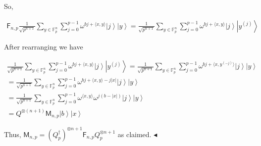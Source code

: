 \documentclass[10pt,a4paper]{article}
\begin{document}
So,\par


\[\begin{gathered}
\displaystyle\mathsf{F}_{n,p}\frac{1}{\sqrt{p^{n+1}}}\sum_{y\in\mathbb{F}_{p}^{n}}\sum_{j=0}^{p-1}\omega^{bj+\langle x,y\rangle}\left|j\right\rangle\left|y\right\rangle \displaystyle=\frac{1}{\sqrt{p^{n+1}}}\sum_{y\in\mathbb{F}_{p}^{n}}\sum_{j=0}^{p-1}\omega^{bj+\langle x,y\rangle}\left|j\right\rangle\left|y^{(j)}\right\rangle
\end{gathered}\]


After rearranging we have\par


\[\begin{gathered}
\displaystyle\frac{1}{\sqrt{p^{n+1}}}\sum_{y\in\mathbb{F}_{p}^{n}}\sum_{j=0}^{p-1}\omega^{bj+\langle x,y\rangle}\left|j\right\rangle\left|y^{(j)}\right\rangle \displaystyle=\frac{1}{\sqrt{p^{n+1}}}\sum_{y\in\mathbb{F}_{p}^{n}}\sum_{j=0}^{p-1}\omega^{bj+\langle x,y^{(-j)}\rangle}\left|j\right\rangle\left|y\right\rangle \\
\displaystyle=\frac{1}{\sqrt{p^{n+1}}}\sum_{y\in\mathbb{F}_{p}^{n}}\sum_{j=0}^{p-1}\omega^{bj+\langle x,y\rangle-j|x|}\left|j\right\rangle\left|y\right\rangle \\
\displaystyle=\frac{1}{\sqrt{p^{n+1}}}\sum_{y\in\mathbb{F}_{p}^{n}}\sum_{j=0}^{p-1}\omega^{\langle x,y\rangle}\omega^{j(b-|x|)}\left|j\right\rangle\left|y\right\rangle \\
\displaystyle=Q^{\otimes(n+1)}\mathsf{M}_{n,p}\left|b\right\rangle\left|x\right\rangle
\end{gathered}\]


Thus, $\mathsf{M}_{n,p}=(Q_{p}^{\dagger})^{\otimes{n+1}}\mathsf{F}_{n,p}Q_{p}^{\otimes{n+1}}$ as claimed.
$\blacktriangleleft$\par




\par
\end{document}
